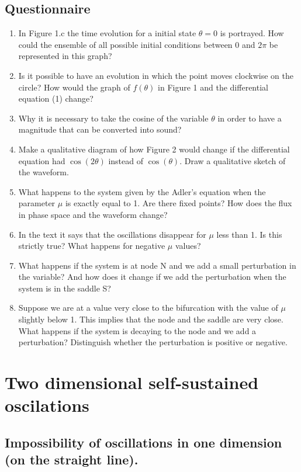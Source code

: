 \documentclass{article}
\begin{document}
\subsection{Questionnaire}
\begin{enumerate}
    \item In Figure 1.c the time evolution for a initial state $\theta=0$ is portrayed. How could the ensemble of all possible initial conditions between 0 and $2\pi$ be represented in this graph?
    \item Is it possible to have an evolution in which the point moves clockwise on the circle? How would the graph of $f(\theta)$ in Figure 1 and the differential equation (1) change?
    \item Why it is necessary to take the cosine of the variable $\theta$ in order to have a magnitude that can be converted into sound?
    \item Make a qualitative diagram of how Figure 2 would change if the differential equation had $\cos(2\theta)$ instead of $\cos(\theta)$. Draw a qualitative sketch of the waveform.
    \item What happens to the system given by the Adler's equation when the parameter $\mu$ is exactly equal to 1. Are there fixed points? How does the flux in phase space and the waveform change?
    \item In the text it says that the oscillations disappear for $\mu$ less than 1. Is this strictly true? What happens for negative $\mu$ values?
    \item What happens if the system is at node N and we add a small perturbation in the variable? And how does it change if we add the perturbation when the system is in the saddle S? 
    \item Suppose we are at a value very close to the bifurcation with the value of $\mu$ slightly below 1. This implies that the node and the saddle are very close. What happens if the system is decaying to the node and we add a perturbation? Distinguish whether the perturbation is positive or negative.
\end{enumerate}

\newpage

\section{Two dimensional self-sustained oscilations}

\subsection{Impossibility of oscillations in one dimension (on the straight line).}
\end{document}
